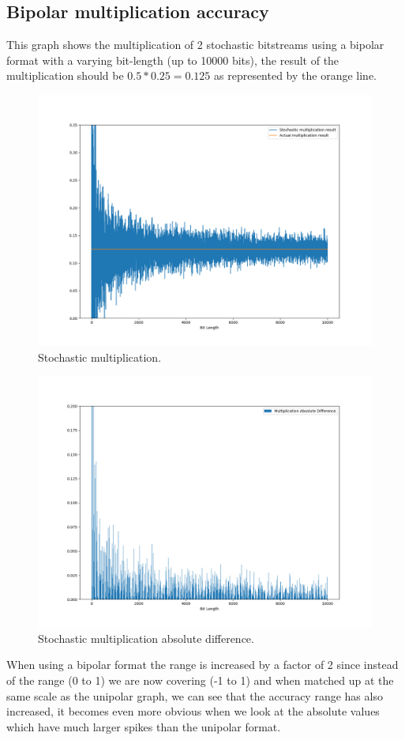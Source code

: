 \documentclass[a4paper,oneside,phd,etd]{BYUPhys}
\begin{document}
\subsection{Bipolar multiplication accuracy}
This graph shows the multiplication of 2 stochastic bitstreams using a bipolar format with a varying bit-length (up to 10000 bits), the result of the multiplication should be $0.5*0.25=0.125$ as represented by the orange line.
\begin{figure}[H]
\centering
\includegraphics[scale=0.4]{results/Figure_1_bi.png}
\caption{Stochastic multiplication.}
\label{fig:mult}
\end{figure}
\begin{figure}[H]
\centering
\includegraphics[scale=0.4]{results/Figure_1_bi_abs.png}
\caption{Stochastic multiplication absolute difference.}
\label{fig:abs_mult}
\end{figure}
When using a bipolar format the range is increased by a factor of 2 since instead of the range (0 to 1) we are now covering (-1 to 1) and when matched up at the same scale as the unipolar graph, we can see that the accuracy range has also increased, it becomes even more obvious when we look at the absolute values which have much larger spikes than the unipolar format.
\end{document}
